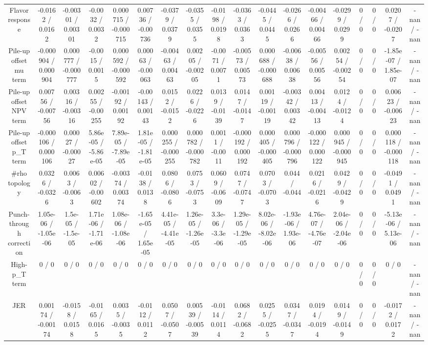 \documentclass[10pt]{article}
\begin{document}
\begin{table}[htbp]
\begin{center}
\begin{tabular}{|c|c|c|c|c|c|c|c|c|c|c|c|c|c|c|c|c|c|}
  Flavor response & -0.0162 / 0.0162 & -0.00301 / 0.00301 & -0.0032 / 0.0032 & 0.000715 / -0.000715 & 0.00736 / -0.00736 & -0.0379 / 0.0379 & -0.0355 / 0.0355 & -0.0198 / 0.0198 & -0.0363 / 0.0363 & -0.0445 / 0.0445 & -0.0266 / 0.0266 & -0.00466 / 0.00466 & -0.0299 / 0.0299 & 0 / 0 & 0 / 0 & 0.0207 / -0.0207 & -nan / -nan \\ 
  Pile-up offset mu term & -0.000904 / 0.000904 & 0.000777 / -0.000777 & -0.0015 / 0.0015 & 0.000592 / -0.000592 & 0.00063 / -0.00063 & -0.00463 / 0.00463 & 0.00205 / -0.00205 & -0.0071 / 0.0071 & -0.00573 / 0.00573 & 0.000688 / -0.000688 & -0.00638 / 0.00638 & -0.00556 / 0.00556 & 0.00254 / -0.00254 & 0 / 0 & 0 / 0 & -1.85e-07 / 1.85e-07 & -nan / -nan \\ 
  Pile-up offset NPV term & 0.00756 / -0.00756 & 0.00316 / -0.00316 & 0.00255 / -0.00255 & -0.00192 / 0.00192 & -0.00143 / 0.00143 & 0.0152 / -0.0152 & 0.0226 / -0.0226 & 0.0139 / -0.0139 & 0.0147 / -0.0147 & 0.00119 / -0.00119 & -0.00342 / 0.00342 & 0.00413 / -0.00413 & 0.0124 / -0.0124 & 0 / 0 & 0 / 0 & 0.00623 / -0.00623 & -nan / -nan \\ 
  Pile-up offset p_{T} term & -0.000106 / 0.000106 & 0.00027 / -0.00027 & 5.86e-05 / -5.86e-05 & 7.89e-05 / -7.89e-05 & 1.81e-05 / -1.81e-05 & 0.000255 / -0.000255 & 0.000782 / -0.000782 & 0.0011 / -0.0011 & -0.000192 / 0.000192 & 0.000405 / -0.000405 & 0.000796 / -0.000796 & -0.000122 / 0.000122 & 0.000945 / -0.000945 & 0 / 0 & 0 / 0 & 0.000118 / -0.000118 & -nan / -nan \\ 
  #rho topology & 0.0326 / -0.0326 & 0.0063 / -0.0063 & 0.00602 / -0.00602 & -0.00374 / 0.00374 & -0.0138 / 0.0138 & 0.0806 / -0.0806 & 0.0753 / -0.0753 & 0.0609 / -0.0609 & 0.0747 / -0.0747 & 0.0703 / -0.0703 & 0.044 / -0.044 & 0.0216 / -0.0216 & 0.0429 / -0.0429 & 0 / 0 & 0 / 0 & -0.0491 / 0.0491 & -nan / -nan \\ 
  Punch-through correction & 1.05e-06 / -1.05e-06 & 1.5e-05 / -1.5e-05 & 1.71e-06 / -1.71e-06 & 1.08e-06 / -1.08e-06 & -1.65e-05 / 1.65e-05 & 4.41e-05 / -4.41e-05 & 1.26e-05 / -1.26e-05 & 3.3e-06 / -3.3e-06 & 1.29e-05 / -1.29e-05 & 8.02e-06 / -8.02e-06 & -1.93e-06 / 1.93e-06 & 4.76e-07 / -4.76e-07 & 2.04e-06 / -2.04e-06 & 0 / 0 & 0 / 0 & -5.13e-06 / 5.13e-06 & -nan / -nan \\ 
  High-p_{T} term & 0 / 0 & 0 / 0 & 0 / 0 & 0 / 0 & 0 / 0 & 0 / 0 & 0 / 0 & 0 / 0 & 0 / 0 & 0 / 0 & 0 / 0 & 0 / 0 & 0 / 0 & 0 / 0 & 0 / 0 & 0 / 0 & -nan / -nan \\ 
  JER & 0.00174 / -0.00174 & -0.0158 / 0.0158 & -0.0165 / 0.0165 & 0.0035 / -0.0035 & -0.0112 / 0.0112 & 0.0507 / -0.0507 & 0.00539 / -0.00539 & -0.0114 / 0.0114 & 0.0682 / -0.0682 & 0.0255 / -0.0255 & 0.0347 / -0.0347 & 0.0194 / -0.0194 & 0.0149 / -0.0149 & 0 / 0 & 0 / 0 & -0.0172 / 0.0172 & -nan / -nan \\ 

\end{tabular}
\end{center}
\end{table}
\end{document}
